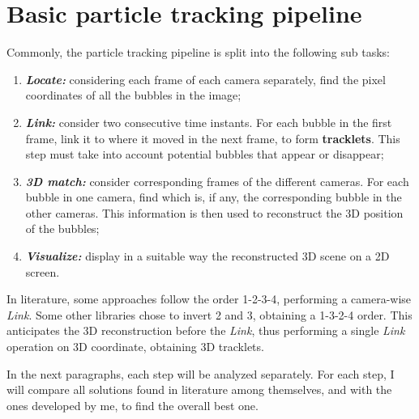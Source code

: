 \chapter{Basic particle tracking pipeline}
\label{chap:basicpipeline}

Commonly, the particle tracking pipeline is split into the following sub tasks:
\begin{enumerate}
	\itemsep 0em
	\item \textit{\textbf{Locate:}} considering each frame of each camera separately, find the pixel coordinates of all the bubbles in the image;
	\item \textit{\textbf{Link:}} consider two consecutive time instants. For each bubble in the first frame, link it to where it moved in the next frame, to form \textbf{tracklets}. This step must take into account potential bubbles that appear or disappear;
	\item \textit{\textbf{3D match:}} consider corresponding frames of the different cameras. For each bubble in one camera, find which is, if any, the corresponding bubble in the other cameras. This information is then used to reconstruct the 3D position of the bubbles;
	\item \textit{\textbf{Visualize:}} display in a suitable way the reconstructed 3D scene on a 2D screen.
\end{enumerate}
In literature, some approaches follow the order 1-2-3-4, performing a camera-wise \textit{Link}.
Some other libraries chose to invert 2 and 3, obtaining a 1-3-2-4 order.
This anticipates the 3D reconstruction before the \textit{Link}, thus performing a single \textit{Link} operation on 3D coordinate, obtaining 3D tracklets.

In the next paragraphs, each step will be analyzed separately.
For each step, I will compare all solutions found in literature among themselves, and with the ones developed by me, to find the overall best one.
